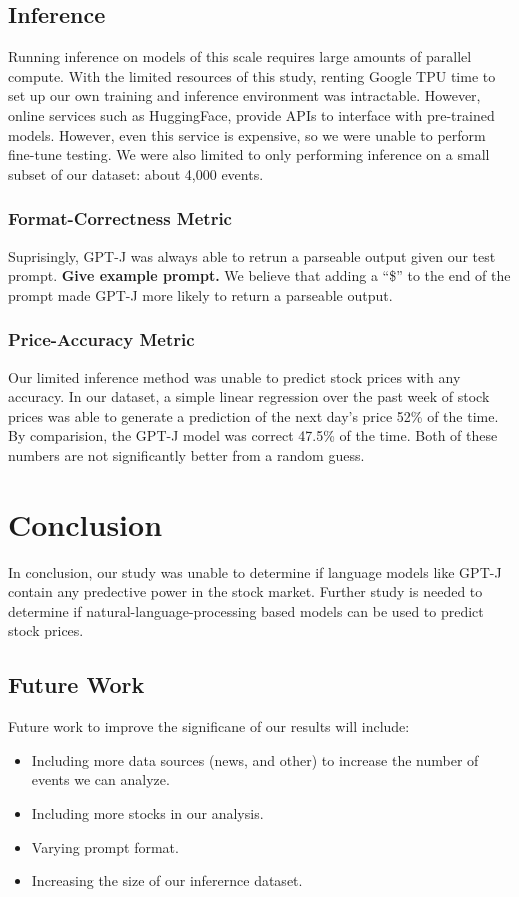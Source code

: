 \documentclass[conference]{IEEEtran}
\begin{document}
\subsection{Inference}
Running inference on models of this scale requires large amounts of parallel compute. With the limited resources of this study, renting Google TPU time to set up our own training and inference environment was intractable. However, online services such as HuggingFace, provide APIs to interface with pre-trained models. However, even this service is expensive, so we were unable to perform fine-tune testing. We were also limited to only performing inference on a small subset of our dataset: about 4,000 events.
\subsubsection{Format-Correctness Metric}
Suprisingly, GPT-J was always able to retrun a parseable output given our test prompt. \textbf{Give example prompt.} We believe that adding a ``\$'' to the end of the prompt made GPT-J more likely to return a parseable output.
\subsubsection{Price-Accuracy Metric}
Our limited inference method was unable to predict stock prices with any accuracy. In our dataset, a simple linear regression over the past week of stock prices was able to generate a prediction of the next day's price 52\% of the time. By comparision, the GPT-J model was correct 47.5\% of the time. Both of these numbers are not significantly better from a random guess. 
\section{Conclusion}
In conclusion, our study was unable to determine if language models like GPT-J contain any predective power in the stock market. Further study is needed to determine if natural-language-processing based models can be used to predict stock prices.
\subsection{Future Work}
Future work to improve the significane of our results will include:
\begin{itemize}
	\item Including more data sources (news, and other) to increase the number of events we can analyze.
	\item Including more stocks in our analysis.
	\item Varying prompt format.
	\item Increasing the size of our inferernce dataset.
\end{itemize}





\end{document}
